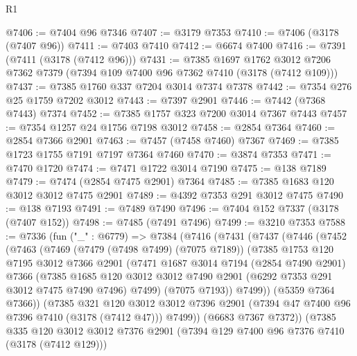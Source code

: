 \begin{lexlean}{R1}
\begin{coremodule}
@7406 := @7404 @96 @7346
@7407 := @3179 @7353
@7410 := @7406 (@3178 (@7407 @96))
@7411 := @7403 @7410
@7412 := @6674 @7400
@7416 := @7391 (@7411 (@3178 (@7412 @96)))
@7431 := @7385
    @1697
    @1762
    @3012
    @7206
    @7362
    @7379
    (@7394 @109 @7400 @96 @7362 @7410 (@3178 (@7412 @109)))
@7437 := @7385 @1760 @337 @7204 @3014 @7374 @7378
@7442 := @7354 @276 @25 @1759 @7202 @3012
@7443 := @7397 @2901
@7446 := @7442 (@7368 @7443) @7374
@7452 := @7385 @1757 @323 @7200 @3014 @7367 @7443
@7457 := @7354 @1257 @24 @1756 @7198 @3012
@7458 := @2854 @7364
@7460 := @2854 @7366 @2901
@7463 := @7457 (@7458 @7460) @7367
@7469 := @7385 @1723 @1755 @7191 @7197 @7364 @7460
@7470 := @3874 @7353
@7471 := @7470 @1720
@7474 := @7471 @1722 @3014 @7190
@7475 := @138 @7189
@7479 := @7474 (@2854 @7475 @2901) @7364
@7485 := @7385 @1683 @120 @3012 @3012 @7475 @2901
@7489 := @4392 @7353 @291 @3012 @7475
@7490 := @138 @7193
@7491 := @7489 @7490
@7496 := @7404 @152 @7337 (@3178 (@7407 @152))
@7498 := @7485 (@7491 @7496)
@7499 := @3210 @7353
@7588 := @7336
    (fun ("_" : @6779) =>
    @7384
      (@7416
        (@7431
          (@7437
            (@7446
              (@7452
                (@7463
                  (@7469
                    (@7479 (@7498 @7499) (@7075 @7189))
                    (@7385
                      @1753
                      @120
                      @7195
                      @3012
                      @7366
                      @2901
                      (@7471
                        @1687
                        @3014
                        @7194
                        (@2854 @7490 @2901)
                        @7366
                        (@7385
                          @1685
                          @120
                          @3012
                          @3012
                          @7490
                          @2901
                          (@6292 @7353 @291 @3012 @7475 @7490 @7496)
                          @7499)
                        (@7075 @7193))
                      @7499))
                  (@5359 @7364 @7366))
                (@7385
                  @321
                  @120
                  @3012
                  @3012
                  @7396
                  @2901
                  (@7394 @47 @7400 @96 @7396 @7410 (@3178 (@7412 @47)))
                  @7499))
              (@6683 @7367 @7372))
            (@7385
              @335
              @120
              @3012
              @3012
              @7376
              @2901
              (@7394 @129 @7400 @96 @7376 @7410 (@3178 (@7412 @129)))

\end{coremodule}
\end{lexlean}
